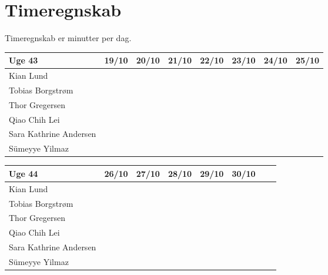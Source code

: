 \newpage
\section{Timeregnskab}
Timeregnskab er minutter per dag.

\begin{center}
\begin{tabular}{ | m{12em} | m{1cm}| m{1cm} | m{1cm} | m{1cm} | m{1cm} | m{1cm} | m{1cm} |} 
\hline
Uge 43 & 19/10 & 20/10 & 21/10 & 22/10 & 23/10 & 24/10 & 25/10\\ 
\hline
Kian Lund &  &  &  &  &  &  & \\ 
\hline
Tobias Borgstrøm &  &  &  &  &  &  & \\ 
\hline
Thor Gregersen & &  & & & &  & \\ 
\hline
Qiao Chih Lei &  &  &  &  &  &  & \\ 
\hline
Sara Kathrine Andersen &  &  &  &  &  &  & \\ 
\hline
Sümeyye Yilmaz &  &  &  &  &  &  & \\ 
\hline
\end{tabular}
\end{center}

\begin{center}
\begin{tabular}{ | m{12em} | m{1cm}| m{1cm} | m{1cm} | m{1cm} | m{1cm} | m{1cm} | m{1cm} | } 
\hline
        Uge 44 & 26/10 & 27/10 & 28/10 & 29/10 & 30/10 & &\\ 
\hline
Kian Lund & &  &  & & & &  \\ 
\hline
Tobias Borgstrøm & & & & & & &  \\ 
\hline
Thor Gregersen & & & & & & & \\ 
\hline
Qiao Chih Lei &  &  & & &   &  & \\ 
\hline
Sara Kathrine Andersen &  &  &  &  & &  & \\ 
\hline
Sümeyye Yilmaz & & & & & & & \\ 
\hline
\end{tabular}
\end{center}